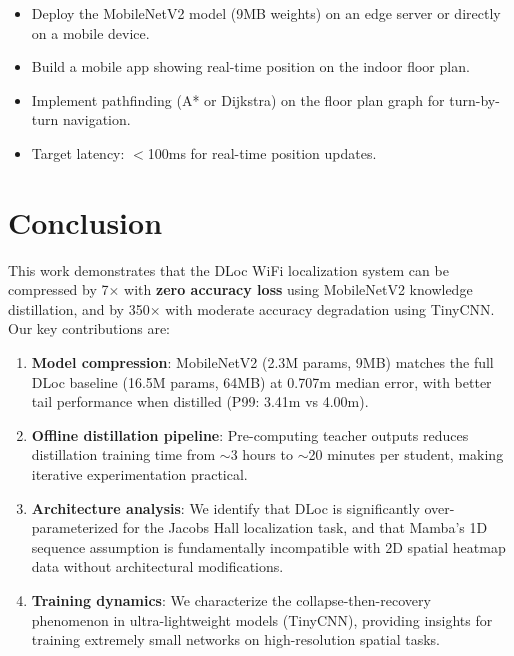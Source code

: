 \documentclass[11pt,a4paper]{article}
\begin{document}
\begin{itemize}[leftmargin=*]
    \item Deploy the MobileNetV2 model (9MB weights) on an edge server or directly on a mobile device.
    \item Build a mobile app showing real-time position on the indoor floor plan.
    \item Implement pathfinding (A* or Dijkstra) on the floor plan graph for turn-by-turn navigation.
    \item Target latency: $<$100ms for real-time position updates.
\end{itemize}

\section{Conclusion}

This work demonstrates that the DLoc WiFi localization system can be compressed by 7$\times$ with \textbf{zero accuracy loss} using MobileNetV2 knowledge distillation, and by 350$\times$ with moderate accuracy degradation using TinyCNN. Our key contributions are:

\begin{enumerate}[leftmargin=*]
    \item \textbf{Model compression}: MobileNetV2 (2.3M params, 9MB) matches the full DLoc baseline (16.5M params, 64MB) at 0.707m median error, with better tail performance when distilled (P99: 3.41m vs 4.00m).

    \item \textbf{Offline distillation pipeline}: Pre-computing teacher outputs reduces distillation training time from $\sim$3 hours to $\sim$20 minutes per student, making iterative experimentation practical.

    \item \textbf{Architecture analysis}: We identify that DLoc is significantly over-parameterized for the Jacobs Hall localization task, and that Mamba's 1D sequence assumption is fundamentally incompatible with 2D spatial heatmap data without architectural modifications.

    \item \textbf{Training dynamics}: We characterize the collapse-then-recovery phenomenon in ultra-lightweight models (TinyCNN), providing insights for training extremely small networks on high-resolution spatial tasks.
\end{enumerate}
\end{document}
